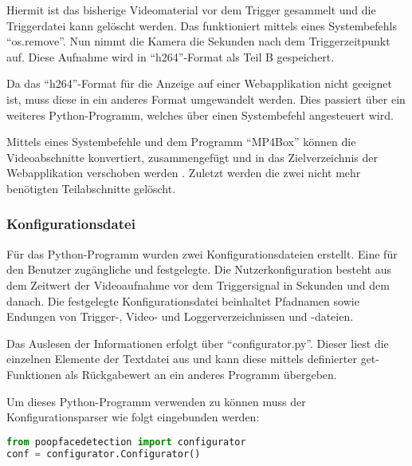 Hiermit ist das bisherige Videomaterial vor dem Trigger gesammelt und die Triggerdatei kann gelöscht werden. Das funktioniert mittels eines Systembefehls "`os.remove"'. Nun nimmt die Kamera die Sekunden nach dem Triggerzeitpunkt auf. Diese Aufnahme wird in "`h264"'-Format als Teil B gespeichert.

Da das "`h264"'-Format für die Anzeige auf einer Webapplikation nicht geeignet ist, muss diese in ein anderes Format umgewandelt werden. Dies passiert über ein weiteres Python-Programm, welches über einen Systembefehl angesteuert wird.

Mittels eines Systembefehle und dem Programm "`MP4Box"' können die Videoabschnitte konvertiert, zusammengefügt und in das Zielverzeichnis der Webapplikation verschoben werden \cite{convert_video}. Zuletzt werden die zwei nicht mehr benötigten Teilabschnitte gelöscht.

\subsubsection{Konfigurationsdatei}

Für das Python-Programm wurden zwei Konfigurationsdateien erstellt. Eine für den Benutzer zugängliche und festgelegte.
Die Nutzerkonfiguration besteht aus dem Zeitwert der Videoaufnahme vor dem Triggersignal in Sekunden und dem danach.
Die festgelegte Konfigurationsdatei beinhaltet Pfadnamen sowie Endungen von Trigger-, Video- und Loggerverzeichnissen und -dateien.

Das Auslesen der Informationen erfolgt über "`configurator.py"'. Dieser liest die einzelnen Elemente der Textdatei aus und kann diese mittels definierter get-Funktionen als Rückgabewert an ein anderes Programm übergeben.

Um dieses Python-Programm verwenden zu können muss der Konfigurationsparser wie folgt eingebunden werden:

\begin{lstlisting}[language=Python]
from poopfacedetection import configurator
conf = configurator.Configurator()
\end{lstlisting}
